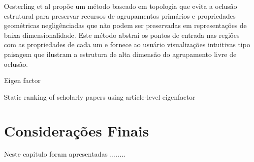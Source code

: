  Oesterling et al \cite{oesterling2014topology} propõe um método baseado em topologia que evita a oclusão estrutural para preservar recursos de agrupamentos primários e propriedades geométricas negligênciadas que não podem ser preservadas em representações de baixa dimensionalidade. Este método abstrai os pontos de entrada nas regiões com as propriedades de cada um e fornece ao usuário visualizações intuitivas tipo paisagem que ilustram a estrutura de alta dimensão do agrupamento livre de oclusão.
 
\cite{bergstromeigenfactor}Eigen factor 

\cite{wesley2015static} Static ranking of scholarly papers using article-level eigenfactor

\section{Considerações Finais}
\label{consideracoes-finais-sec}

Neste capitulo foram apresentadas ........

